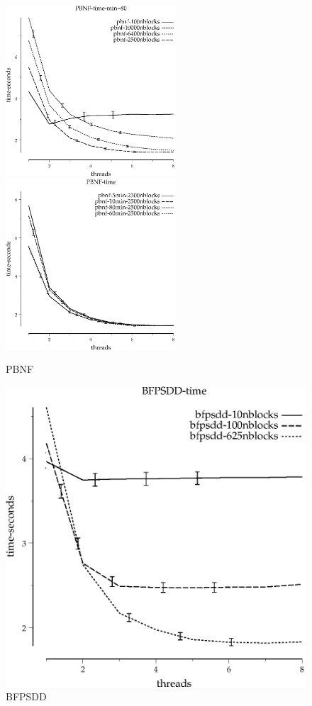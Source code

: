 \documentclass{article}
\begin{document}
\begin{figure}
\begin{center}
\includegraphics[width=2.5in]{PBNF-time-min=80}
\includegraphics[width=2.5in]{PBNF-time}
\end{center}
\caption{PBNF}
\end{figure}

\begin{figure}
\begin{center}
\includegraphics{BFPSDD-time}
\end{center}
\caption{BFPSDD}
\end{figure}
\end{document}
